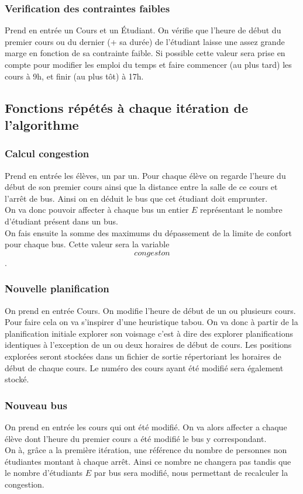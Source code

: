 \documentclass[a4paper,11pt]{article}
\begin{document}
		\subsubsection{Verification des contraintes faibles}
			Prend en entrée un Cours et un Étudiant.
			On vérifie que l'heure de début du premier cours ou du dernier (+ sa durée) de l'étudiant laisse une assez grande marge en fonction de sa contrainte faible.
			Si possible cette valeur sera prise en compte pour modifier les emploi du temps et faire commencer (au plus tard) les cours à 9h, et finir (au plus tôt) à 17h.
		\subsection{Fonctions répétés à chaque itération de l'algorithme}
			\subsubsection{Calcul congestion}
				Prend en entrée les élèves, un par un.
				Pour chaque élève on regarde l'heure du début de son premier cours ainsi que la distance entre la salle de ce cours et l'arrêt de bus. 
				Ainsi on en déduit le bus que cet étudiant doit emprunter.\\
				On va donc pouvoir affecter à chaque bus un entier $E$ représentant le nombre d'étudiant présent dans un bus.\\
				On fais ensuite la somme des maximums du dépassement de la limite de confort pour chaque bus. Cette valeur sera la variable $$congeston$$.
			\subsubsection{Nouvelle planification}
				On prend en entrée Cours.
				On modifie l'heure de début de un ou plusieurs cours. Pour faire cela on va s'inspirer d'une heuristique tabou.
				On va donc à partir de la planification initiale explorer son voisnage c'est à dire des explorer planifications identiques à l'exception
				de un ou deux horaires de début de cours.
				Les positions explorées seront stockées dans un fichier de sortie répertoriant les horaires de début de chaque cours.
				Le numéro des cours ayant été modifié sera également stocké.
			\subsubsection{Nouveau bus}
				On prend en entrée les cours qui ont été modifié.
				On va alors affecter a chaque élève dont l'heure du premier cours a été modifié le bus y correspondant.\\
				On à, grâce a la première itération, une référence du nombre de personnes non étudiantes montant à chaque arrêt. Ainsi ce nombre ne changera pas tandis que le nombre d'étudiants $E$ par bus sera modifié, nous permettant de recalculer la congestion. 
\end{document}
